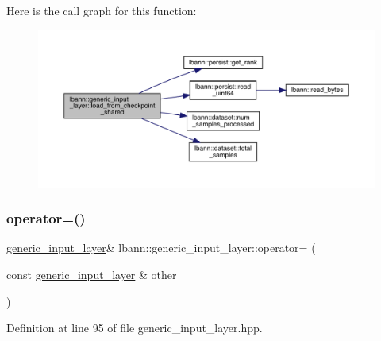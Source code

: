 Here is the call graph for this function\+:\nopagebreak
\begin{figure}[H]
\begin{center}
\leavevmode
\includegraphics[width=350pt]{classlbann_1_1generic__input__layer_ae5a542333eaf447a05fc586848e7c94c_cgraph}
\end{center}
\end{figure}
\mbox{\label{classlbann_1_1generic__input__layer_a76d36777d01144cafe7b33ab5ce739d2}} 
\subsubsection{\texorpdfstring{operator=()}{operator=()}}
{\footnotesize\ttfamily \hyperlink{classlbann_1_1generic__input__layer}{generic\+\_\+input\+\_\+layer}\& lbann\+::generic\+\_\+input\+\_\+layer\+::operator= (\begin{DoxyParamCaption}\item[{const \hyperlink{classlbann_1_1generic__input__layer}{generic\+\_\+input\+\_\+layer} \&}]{other }\end{DoxyParamCaption})\hspace{0.3cm}{\ttfamily [inline]}}



Definition at line 95 of file generic\+\_\+input\+\_\+layer.\+hpp.


